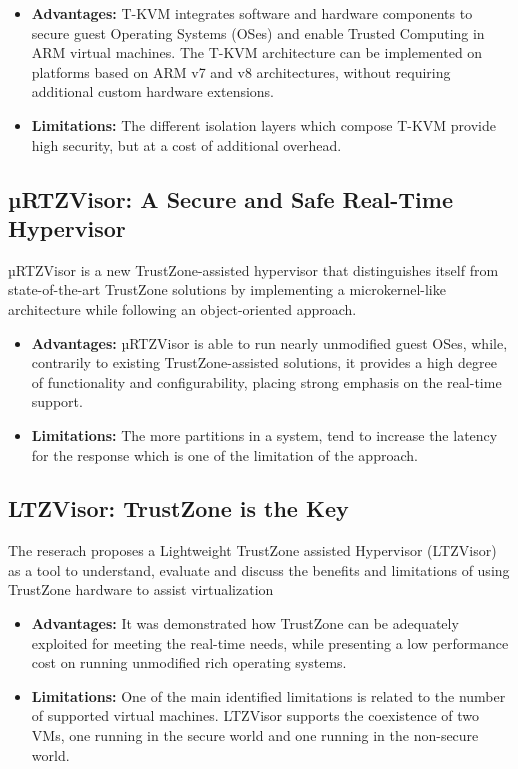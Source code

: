\documentclass[conference]{IEEEtran}
\begin{document}
\begin{itemize}
    \item \textbf{Advantages:} T-KVM integrates software and hardware components to secure guest Operating Systems (OSes) and enable Trusted Computing in ARM virtual machines.  The T-KVM architecture can be implemented on platforms based on ARM v7 and v8 architectures, without requiring additional custom hardware extensions.
    \item \textbf{Limitations:} The different isolation layers which compose T-KVM provide high security, but at a cost of additional overhead.
\end{itemize}


\subsection{µRTZVisor: A Secure and Safe Real-Time Hypervisor}
\cite{hyper3} µRTZVisor is a new TrustZone-assisted hypervisor that distinguishes itself from state-of-the-art TrustZone solutions by implementing a microkernel-like architecture while following an object-oriented approach.
\begin{itemize}
    \item \textbf{Advantages:} µRTZVisor is able to run nearly unmodified guest OSes, while, contrarily to existing TrustZone-assisted solutions, it provides a high degree of functionality and configurability, placing strong emphasis on the real-time support.
    \item \textbf{Limitations:} The more partitions in a system, tend to increase the latency for the response which is one of the limitation of the approach.
\end{itemize}


\subsection{LTZVisor: TrustZone is the Key}
\cite{hyper4} The reserach proposes a Lightweight TrustZone assisted Hypervisor (LTZVisor) as a tool to understand, evaluate and discuss the benefits and limitations of using TrustZone hardware to assist virtualization
\begin{itemize}
    \item \textbf{Advantages:} It was demonstrated how TrustZone can be adequately exploited for meeting the real-time needs, while presenting a low performance cost on running unmodified rich operating systems.
    \item \textbf{Limitations:} One of the main identified limitations is related to the number of supported virtual machines. LTZVisor supports the coexistence of two VMs, one running in the secure world and one running in the non-secure world.
\end{itemize}
\end{document}
